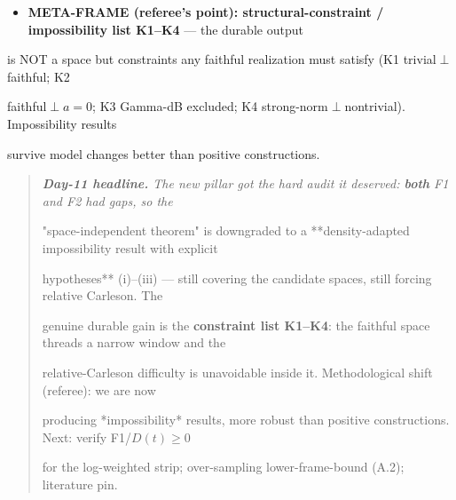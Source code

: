 \documentclass[10pt]{article}
\begin{document}
\begin{itemize}
\item \textbf{META-FRAME (referee's point): structural-constraint / impossibility list K1--K4} --- the durable output
\end{itemize}
  is NOT a space but constraints any faithful realization must satisfy (K1 trivial$\perp$faithful; K2\par
  faithful$\perp a=0$; K3 Gamma-dB excluded; K4 strong-norm$\perp$nontrivial). Impossibility results\par
  survive model changes better than positive constructions.\par

\begin{quote}\itshape
\textbf{Day-11 headline.} The new pillar got the hard audit it deserved: \textbf{both} F1 and F2 had gaps, so the\par
"space-independent theorem" is downgraded to a **density-adapted impossibility result with explicit\par
hypotheses** (i)--(iii) --- still covering the candidate spaces, still forcing relative Carleson. The\par
genuine durable gain is the \textbf{constraint list K1--K4}: the faithful space threads a narrow window and the\par
relative-Carleson difficulty is unavoidable inside it. Methodological shift (referee): we are now\par
producing *impossibility* results, more robust than positive constructions. Next: verify F1/$D(t)\ge0$\par
for the log-weighted strip; over-sampling lower-frame-bound (A.2); literature pin.\par
\end{quote}
\end{document}
